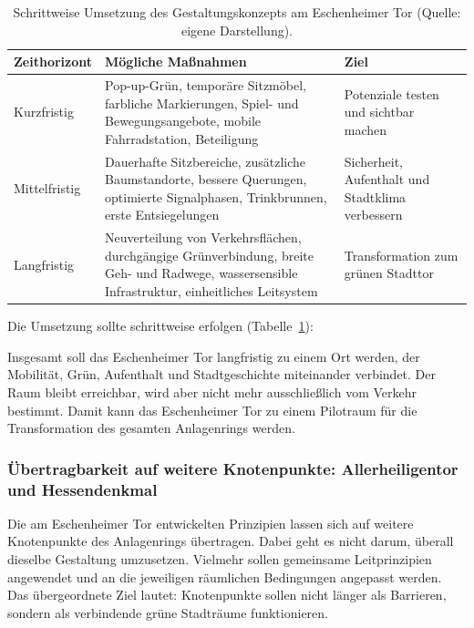 \documentclass[a4paper,12pt]{article}
\begin{document}
\begin{table}[h]
	\centering
	\small
	\begin{tabularx}{\textwidth}{l X X}
		\toprule
		\textbf{Zeithorizont} & \textbf{Mögliche Maßnahmen} & \textbf{Ziel}\\
		\midrule
		Kurzfristig & Pop-up-Grün, temporäre Sitzmöbel, farbliche Markierungen, Spiel- und Bewegungsangebote, mobile Fahrradstation, Beteiligung & Potenziale testen und sichtbar machen\\
		\midrule
		Mittelfristig & Dauerhafte Sitzbereiche, zusätzliche Baumstandorte, bessere Querungen, optimierte Signalphasen, Trinkbrunnen, erste Entsiegelungen & Sicherheit, Aufenthalt und Stadtklima verbessern\\
		\midrule
		Langfristig & Neuverteilung von Verkehrsflächen, durchgängige Grünverbindung, breite Geh- und Radwege, wassersensible Infrastruktur, einheitliches Leitsystem & Transformation zum grünen Stadttor\\
		\bottomrule
	\end{tabularx}
	\caption[Zeithorizonte der Umsetzung am Eschenheimer Tor]{Schrittweise Umsetzung des Gestaltungskonzepts am Eschenheimer Tor (Quelle: eigene Darstellung).}
	\label{tab:zeithorizont}
\end{table}

Die Umsetzung sollte schrittweise erfolgen (Tabelle~\ref{tab:zeithorizont}):

Insgesamt soll das Eschenheimer Tor langfristig zu einem Ort werden, der Mobilität, Grün, Aufenthalt und Stadtgeschichte miteinander verbindet. Der Raum bleibt erreichbar, wird aber nicht mehr ausschließlich vom Verkehr bestimmt. Damit kann das Eschenheimer Tor zu einem Pilotraum für die Transformation des gesamten Anlagenrings werden.

\subsubsection{Übertragbarkeit auf weitere Knotenpunkte: Allerheiligentor und Hessendenkmal}

Die am Eschenheimer Tor entwickelten Prinzipien lassen sich auf weitere Knotenpunkte des Anlagenrings übertragen. Dabei geht es nicht darum, überall dieselbe Gestaltung umzusetzen. Vielmehr sollen gemeinsame Leitprinzipien angewendet und an die jeweiligen räumlichen Bedingungen angepasst werden. Das übergeordnete Ziel lautet: Knotenpunkte sollen nicht länger als Barrieren, sondern als verbindende grüne Stadträume funktionieren.
\end{document}
